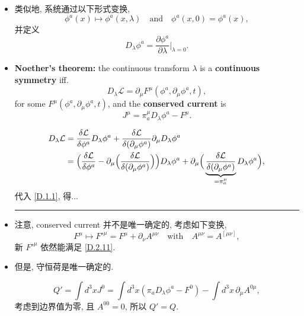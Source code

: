 \begin{itemize}
	\item 类似地, 系统通过以下形式变换,
	\begin{equation}
		\phi^a(x) \mapsto \phi^a(x, \lambda) \quad \text{and} \quad \phi^a(x, 0) = \phi^a(x),
	\end{equation}
	并定义
	\begin{equation}
		D_\lambda \phi^a = \frac{\partial \phi^a}{\partial \lambda} \Big|_{\lambda = 0}.
	\end{equation}
	
	\item \textbf{Noether's theorem:} the continuous transform $\lambda$ is a \textbf{continuous symmetry} iff.
	\begin{equation} \label{D.2.11}
		D_\lambda \mathcal{L} = \partial_\mu F^\mu(\phi^a, \partial_\mu \phi^a, t),
	\end{equation}
	for some $F^\mu(\phi^a, \partial_\mu \phi^a, t)$, and the \textbf{conserved current} is
	\begin{equation} \label{D.2.12}
		J^\mu = \pi_a^\mu D_\lambda \phi^a - F^\mu.
	\end{equation}
	
	\begin{tcolorbox}[title=proof:]
		\begin{align}
			D_\lambda \mathcal{L} &= \frac{\delta \mathcal{L}}{\delta \phi^a} D_\lambda \phi^a + \frac{\delta \mathcal{L}}{\delta (\partial_\mu \phi^a)} \partial_\mu D_\lambda \phi^a \notag \\
			&= \Big( \frac{\delta \mathcal{L}}{\delta \phi^a} - \partial_\mu \Big( \frac{\delta \mathcal{L}}{\delta (\partial_\mu \phi^a)} \Big) \Big) D_\lambda \phi^a + \partial_\mu \Big( \underbrace{\frac{\delta \mathcal{L}}{\delta (\partial_\mu \phi^a)}}_{= \pi_a^\mu} D_\lambda \phi^a \Big),
		\end{align}
		代入 \eqref{D.1.1}, 得...
	\end{tcolorbox}
	
	\noindent\rule[0.5ex]{\linewidth}{0.5pt} %
	
	\item 注意, conserved current 并不是唯一确定的, 考虑如下变换,
	\begin{equation}
		F^\mu \mapsto F'^\mu = F^\mu + \partial_\nu A^{\mu \nu} \quad \text{with} \quad A^{\mu \nu} = A^{[\mu \nu]},
	\end{equation}
	新 $F'^\mu$ 依然能满足 \eqref{D.2.11}.
	
	\item 但是, 守恒荷是唯一确定的.
	
	\begin{tcolorbox}[title=proof:]
		\begin{equation}
			Q' = \int d^3 x J^0 = \int d^3 x (\pi_a D_\lambda \phi^a - F^0) - \int d^3 x \, \partial_\mu A^{0 \mu},
		\end{equation}
		考虑到边界值为零, 且 $A^{0 0} = 0$, 所以 $Q' = Q$.
	\end{tcolorbox}
\end{itemize}

